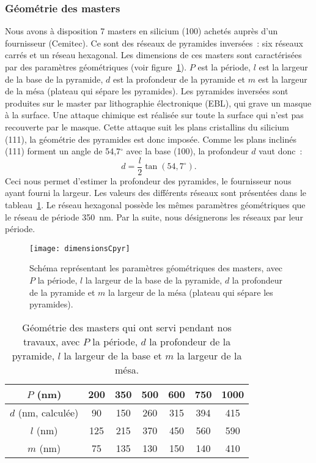 	\subsubsection{Géométrie des masters}
Nous avons à disposition 7 masters en silicium (100) achetés auprès d'un fournisseur (Cemitec). Ce sont des réseaux de pyramides inversées~: six réseaux carrés et un réseau hexagonal. Les dimensions de ces masters sont caractérisées par des paramètres géométriques (voir figure~\ref{dimensionsCpyrChapter3}). $P$ est la période, $l$ est la largeur de la base de la pyramide, $d$ est la profondeur de la pyramide et $m$ est la largeur de la mésa (plateau qui sépare les pyramides). Les pyramides inversées sont produites sur le master par lithographie électronique (EBL), qui grave un masque à la surface. Une attaque chimique est réalisée sur toute la surface qui n'est pas recouverte par le masque. Cette attaque suit les plans cristallins du silicium (111), la géométrie des pyramides est donc imposée. Comme les plans inclinés (111) forment un angle de 54,7$^\circ$ avec la base (100), la profondeur $d$ vaut donc~:
\begin{equation}
d = \dfrac{l}{2}\tan(54,7^\circ).
\end{equation}
Ceci nous permet d'estimer la profondeur des pyramides, le fournisseur nous ayant fourni la largeur. Les valeurs des différents réseaux sont présentées dans le tableau~\ref{tGeometrie}. Le réseau hexagonal possède les mêmes paramètres géométriques que le réseau de période 350~nm. Par la suite, nous désignerons les réseaux par leur période.\par 

\begin{figure}[!htb]
\centering
\texttt{[image: dimensionsCpyr]}
\caption{Schéma représentant les paramètres géométriques des masters, avec $P$ la période, $l$ la largeur de la base de la pyramide, $d$ la profondeur de la pyramide et $m$ la largeur de la mésa (plateau qui sépare les pyramides).}
\label{dimensionsCpyrChapter3}
\end{figure}

\begin{table}[!htb]
\centering
\begin{tabular}{ccccccc}
\hline
$P$ (nm) & 200 & 350 & 500 & 600 & 750 & 1000\\
\hline
$d$ (nm, calculée) & 90 & 150 & 260 & 315 & 394 & 415\\
$l$ (nm) & 125 & 215 & 370 & 450 & 560 & 590\\
$m$ (nm) & 75 & 135 & 130 & 150 & 140 & 410\\
\hline
\end{tabular}
\caption{Géométrie des masters qui ont servi pendant nos travaux, avec $P$ la période, $d$ la profondeur de la pyramide, $l$ la largeur de la base et $m$ la largeur de la mésa.}
\label{tGeometrie}
\end{table}

